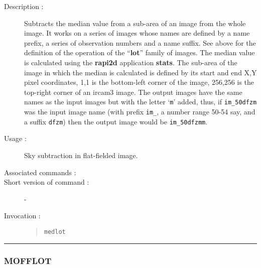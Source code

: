 \begin{description}

\item[Description :] Subtracts the median value from a
sub-area of an image from the whole image.  It works on a series of
images whose names are defined by a name prefix, a series of
observation numbers and a name suffix. See above for the definition of
the operation of the ``{\bf lot}'' family of images.  The median value
is calculated using the {\bf rapi2d} application {\bf stats}.  The
sub-area of the image in which the median is calculated is defined by
its start and end X,Y pixel coordinates, 1,1 is the bottom-left corner
of the image, 256,256 is the top-right corner of an {\sc ircam3}
image.  The output images have the same names as the input images but
with the letter `{\tt m}' added, thus, if {\tt im\_50dfzm} was the
input image name (with prefix {\tt im\_}, a number range 50-54 say, and
a suffix {\tt dfzm}) then the output image would be {\tt im\_50dfzmm}.

\item[Usage :] Sky subtraction in flat-fielded image.
\item[Associated commands :] {\tt {}}
\item[Short version of command :] -
\item[Invocation :]

\begin{quote}{\tt  medlot }\end{quote}

\end{description}

\hrule
\subsubsection*{\label{MOFFLOT}MOFFLOT}

